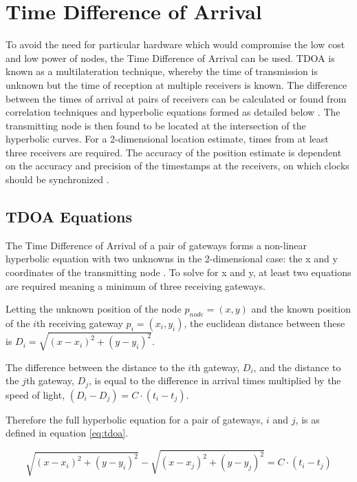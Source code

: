 \documentclass[a4paper]{report}
\begin{document}
  \section{Time Difference of Arrival}
    To avoid the need for particular hardware which would compromise the low cost and low power of nodes, the Time Difference of Arrival can be used. TDOA is known as a multilateration technique, whereby the time of transmission is unknown but the time of reception at multiple receivers is known. The difference between the times of arrival at pairs of receivers can be calculated or found from correlation techniques and hyperbolic equations formed as detailed below \cite{Krizmant1997}. The transmitting node is then found to be located at the intersection of the hyperbolic curves. For a 2-dimensional location estimate, times from at least three receivers are required. The accuracy of the position estimate is dependent on the accuracy and precision of the timestamps at the receivers, on which clocks should be synchronized \cite{Li}.

    \subsection{TDOA Equations}

      The Time Difference of Arrival of a pair of gateways forms a non-linear hyperbolic equation with two unknowns in the 2-dimensional case: the x and y coordinates of the transmitting node \cite{ElGemayel2013}\cite{Steffes2014}. To solve for x and y, at least two equations are required meaning a minimum of three receiving gateways.

      Letting the unknown position of the node \(p_{node} = (x, y)\) and the known position of the \(i\)th receiving gateway \(p_i = (x_i, y_i)\), the euclidean distance between these is \(D_i = \sqrt{(x - x_i)^2 + (y - y_i)^2}\).

      The difference between the distance to the \(i\)th gateway, \(D_{i}\), and the distance to the \(j\)th gateway, \(D_{j}\), is equal to the difference in arrival times multiplied by the speed of light, \((D_i - D_j) = C\cdot(t_i - t_j)\).

      Therefore the full hyperbolic equation for a pair of gateways, \(i\) and \(j\), is as defined in equation \ref{eq:tdoa}.

      \begin{equation}
        \label{eq:tdoa}
        \sqrt{(x - x_i)^2 + (y - y_i)^2} - \sqrt{(x - x_j)^2 + (y - y_j)^2} = C\cdot(t_i - t_j)
      \end{equation}
\end{document}
